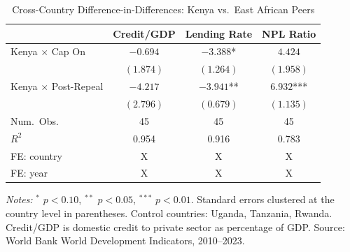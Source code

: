 \begin{table}[!h]
\centering
\caption{Cross-Country Difference-in-Differences: Kenya vs.~East African Peers}
\label{tab:crosscountry}
\begin{threeparttable}
\begin{tabular}{lccc}
\toprule
& Credit/GDP & Lending Rate & NPL Ratio \\
\midrule
Kenya $\times$ Cap On & $-0.694$ & $-3.388$* & $4.424$ \\
& $(1.874)$ & $(1.264)$ & $(1.958)$ \\
Kenya $\times$ Post-Repeal & $-4.217$ & $-3.941$** & $6.932$*** \\
& $(2.796)$ & $(0.679)$ & $(1.135)$ \\
\midrule
Num.\ Obs. & 45 & 45 & 45 \\
$R^2$ & 0.954 & 0.916 & 0.783 \\
FE: country & X & X & X \\
FE: year & X & X & X \\
\bottomrule
\end{tabular}
\begin{tablenotes}[flushleft]
\small
\item \textit{Notes:} $^{*}$ $p<0.10$, $^{**}$ $p<0.05$, $^{***}$ $p<0.01$.
Standard errors clustered at the country level in parentheses.
Control countries: Uganda, Tanzania, Rwanda.
Credit/GDP is domestic credit to private sector as percentage of GDP.
Source: World Bank World Development Indicators, 2010--2023.
\end{tablenotes}
\end{threeparttable}
\end{table}
